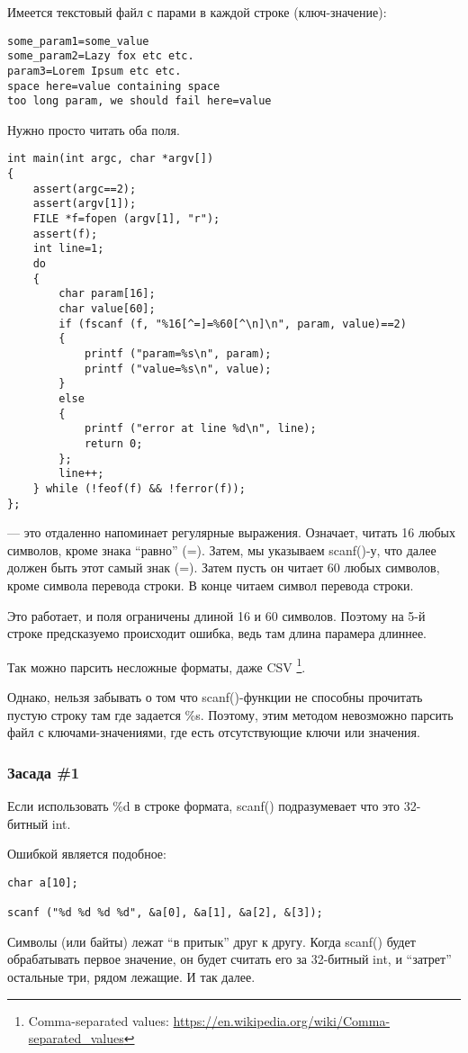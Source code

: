 Имеется текстовый файл с парами в каждой строке (ключ-значение):

\begin{lstlisting}
some_param1=some_value
some_param2=Lazy fox etc etc.
param3=Lorem Ipsum etc etc.
space here=value containing space
too long param, we should fail here=value
\end{lstlisting}

Нужно просто читать оба поля.

\begin{lstlisting}
int main(int argc, char *argv[])
{
	assert(argc==2);
	assert(argv[1]);
	FILE *f=fopen (argv[1], "r");
	assert(f);
	int line=1;
	do
	{
		char param[16];
		char value[60];
		if (fscanf (f, "%16[^=]=%60[^\n]\n", param, value)==2)
		{
			printf ("param=%s\n", param);
			printf ("value=%s\n", value);
		}
		else
		{
			printf ("error at line %d\n", line);
			return 0;
		};
		line++;
	} while (!feof(f) && !ferror(f));
};
\end{lstlisting}

 --- это отдаленно напоминает регулярные выражения. Означает, читать 16 любых символов, кроме
знака ``равно'' (=). Затем, мы указываем scanf()-у, что далее должен быть этот самый знак (=). Затем
пусть он читает 60 любых символов, кроме символа перевода строки. В конце читаем символ перевода строки.

Это работает, и поля ограничены длиной 16 и 60 символов. Поэтому на 5-й строке предсказуемо происходит ошибка,
ведь там длина парамера длиннее.

Так можно парсить несложные форматы, даже CSV
\footnote{Comma-separated values: \url{https://en.wikipedia.org/wiki/Comma-separated_values}}.

Однако, нельзя забывать о том что scanf()-функции не способны прочитать пустую строку там где задается \%s.
Поэтому, этим методом невозможно парсить файл с ключами-значениями, где есть отсутствующие ключи или значения.

\subsubsection{Засада \#1}

Если использовать \%d в строке формата, scanf() подразумевает что это 32-битный int. 

Ошибкой является подобное:

\begin{lstlisting}
char a[10];

scanf ("%d %d %d %d", &a[0], &a[1], &a[2], &[3]);
\end{lstlisting}

Символы (или байты) лежат ``в притык'' друг к другу. Когда scanf() будет обрабатывать первое значение, он будет считать
его за 32-битный int, и ``затрет'' остальные три, рядом лежащие. И так далее.
